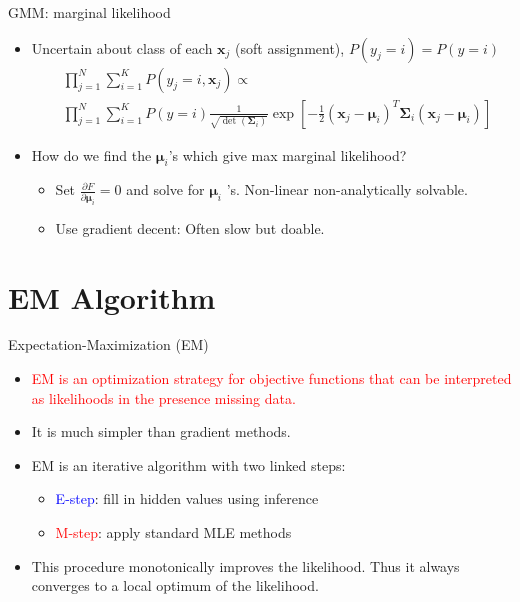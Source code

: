 \documentclass[12pt]{beamer}
\begin{document}
\begin{frame}{GMM: marginal likelihood}
\begin{itemize}
	\item Uncertain about class of each $\bm{x}_j$ (soft assignment), $P(y_j=i)=P(y=i)$
	\begin{equation} \nonumber
	\begin{aligned}
	&\prod_{j=1}^{N}\sum_{i=1}^{K}P(y_j=i,\bm{x}_j)\propto \\
	&\prod_{j=1}^{N}\sum_{i=1}^{K}P(y=i)\frac{1}{\sqrt{\det(\mathbf{\Sigma}_i)}}\exp \left[-\frac{1}{2}(\bm{x}_j-\bm{\mu}_i)^T\mathbf{\Sigma}_i(\bm{x}_j-\bm{\mu}_i)\right]
	\end{aligned}
	\end{equation}
	\item How do we find the $\bm{\mu}_i$'s which give max marginal likelihood? \\[6pt]
	\begin{itemize}
		\item Set $\frac{\partial F}{\partial \bm{\mu}_i}=0$ and solve for $\bm{\mu}_i$ 's. Non-linear non-analytically solvable.
		\item Use gradient decent: Often slow but doable.
	\end{itemize}
\end{itemize}
\end{frame}

\section{EM Algorithm}
\begin{frame}{Expectation-Maximization (EM)}
\begin{itemize}
	\item \textcolor{red}{EM is an optimization strategy for objective functions that can be interpreted as likelihoods in the presence missing data.}
	\item It is much simpler than gradient methods.
	\item EM is an iterative algorithm with two linked steps:
	\begin{itemize}
		\item \textcolor{blue}{E-step}: fill in hidden values using inference
		\item \textcolor{red}{M-step}: apply standard MLE methods
	\end{itemize}
	\item This procedure monotonically improves the likelihood. Thus it always converges to a local optimum of the likelihood.
\end{itemize}
\end{frame}
\end{document}
